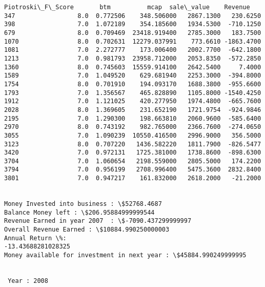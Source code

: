 \documentclass[11pt]{article}
\begin{document}
\begin{Verbatim}[commandchars=\\\{\}]
      Piotroski\_F\_Score       btm          mcap  sale\_value    Revenue
347                 8.0  0.772506    348.506000   2867.1300   230.6250
398                 7.0  1.072189    354.185600   1934.5300  -710.1250
679                 8.0  0.709469  23418.919400   2785.3000   183.7500
1070                8.0  0.702631  12279.037991    773.6610 -1863.4700
1081                7.0  2.272777    173.006400   2002.7700  -642.1800
1213                7.0  0.981793  23958.712000   2053.8350  -572.2850
1360                8.0  0.745603  15559.914100   2642.5400     7.4000
1589                7.0  1.049520    629.681940   2253.3000  -394.8000
1754                8.0  0.701910    194.093170   1688.3800  -955.6600
1793                7.0  1.356567    465.828890   1105.8000 -1540.4250
1912                7.0  1.121025    420.277950   1974.4800  -665.7600
2028                8.0  1.369605    231.652190   1721.9754  -924.9846
2195                7.0  1.290300    198.663810   2060.9600  -585.6400
2970                8.0  0.743192    982.765000   2366.7600  -274.0650
3055                7.0  1.090239  10550.416500   2996.9000   356.5000
3123                8.0  0.707220   1436.582220   1811.7900  -826.5477
3420                7.0  0.972131   1725.381000   1738.8600  -898.6300
3704                7.0  1.060654   2198.559000   2805.5000   174.2200
3794                7.0  0.956199   2708.996400   5475.3600  2832.8400
3801                7.0  0.947217    161.832000   2618.2000   -21.2000


Money Invested into business : \$52768.4687
Balance Money left : \$206.95884999999544
Revenue Earned in year 2007  : \$-7090.437299999997
Overall Revenue Earned : \$10884.990250000003
Annual Return \%:
-13.43688281028325
Money available for investment in next year : \$45884.990249999995


 Year : 2008


\end{Verbatim}
\end{document}
